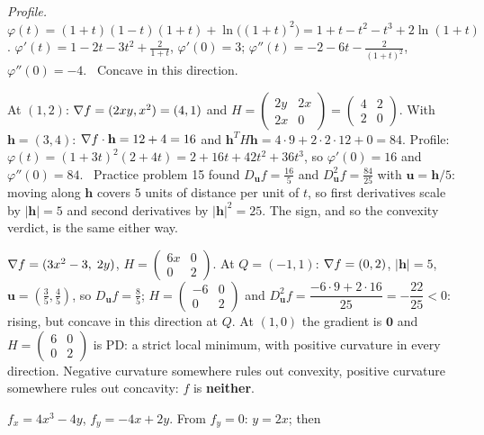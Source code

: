 \begin{solutions}
\[        \]
        \emph{Profile.} $\varphi(t)=(1+t)(1-t)(1+t)+\ln\bigl((1+t)^{2}\bigr)
        =1+t-t^{2}-t^{3}+2\ln(1+t)$. $\varphi'(t)=1-2t-3t^{2}+\tfrac{2}{1+t}$,
        $\varphi'(0)=3$; $\varphi''(t)=-2-6t-\tfrac{2}{(1+t)^{2}}$,
        $\varphi''(0)=-4$. \checkmark\ Concave in this direction.
  \item At $(1,2)$: $\nabla f=(2xy,x^{2})=(4,1)$ and
        $H=\begin{pmatrix}2y&2x\\2x&0\end{pmatrix}=\begin{pmatrix}4&2\\2&0
        \end{pmatrix}$. With $\mathbf{h}=(3,4)$:
        $\nabla f\cdot\mathbf{h}=12+4=16$ and
        $\mathbf{h}^{T}H\mathbf{h}=4\cdot9+2\cdot2\cdot12+0=84$. Profile:
        $\varphi(t)=(1+3t)^{2}(2+4t)=2+16t+42t^{2}+36t^{3}$, so
        $\varphi'(0)=16$ and $\varphi''(0)=84$. \checkmark\ Practice
        problem 15 found $D_{\mathbf{u}}f=\tfrac{16}{5}$ and
        $D^{2}_{\mathbf{u}}f=\tfrac{84}{25}$ with $\mathbf{u}=\mathbf{h}/5$:
        moving along $\mathbf{h}$ covers $5$ units of distance per unit of
        $t$, so first derivatives scale by $|\mathbf{h}|=5$ and second
        derivatives by $|\mathbf{h}|^{2}=25$. The sign, and so the
        convexity verdict, is the same either way.
  \item $\nabla f=(3x^{2}-3,\;2y)$, $H=\begin{pmatrix}6x&0\\0&2\end{pmatrix}$.
        At $Q=(-1,1)$: $\nabla f=(0,2)$, $|\mathbf{h}|=5$,
        $\mathbf{u}=(\tfrac35,\tfrac45)$, so $D_{\mathbf{u}}f=\tfrac85$;
        $H=\begin{pmatrix}-6&0\\0&2\end{pmatrix}$ and
        $D^{2}_{\mathbf{u}}f=\dfrac{-6\cdot9+2\cdot16}{25}=-\dfrac{22}{25}<0$:
        rising, but concave in this direction at $Q$. At $(1,0)$ the
        gradient is $\mathbf{0}$ and $H=\begin{pmatrix}6&0\\0&2\end{pmatrix}$
        is PD: a strict local minimum, with positive curvature in every
        direction. Negative curvature somewhere rules out convexity,
        positive curvature somewhere rules out concavity: $f$ is
        \textbf{neither}.
  \item $f_{x}=4x^{3}-4y$, $f_{y}=-4x+2y$. From $f_{y}=0$: $y=2x$; then

\end{solutions}
